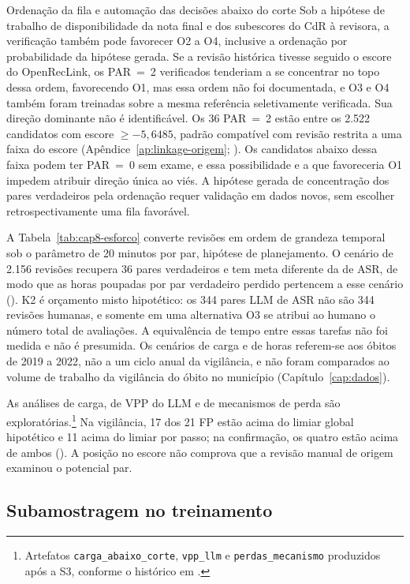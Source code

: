 \begin{chapter}{Ordenação da fila e automação das decisões abaixo do corte}
Sob a hipótese de trabalho de disponibilidade da nota final e dos subescores do CdR à revisora, a verificação também pode favorecer O2 a O4, inclusive a ordenação por probabilidade da hipótese gerada. Se a revisão histórica tivesse seguido o escore do OpenRecLink, os PAR~=~2 verificados tenderiam a se concentrar no topo dessa ordem, favorecendo O1, mas essa ordem não foi documentada, e O3 e O4 também foram treinadas sobre a mesma referência seletivamente verificada. Sua direção dominante não é identificável. Os 36 PAR~=~2 estão entre os 2.522 candidatos com escore $\geq-5{,}6485$, padrão compatível com revisão restrita a uma faixa do escore (Apêndice~\ref{ap:linkage-origem}; ). Os candidatos abaixo dessa faixa podem ter PAR~=~0 sem exame, e essa possibilidade e a que favoreceria O1 impedem atribuir direção única ao viés. A hipótese gerada de concentração dos pares verdadeiros pela ordenação requer validação em dados novos, sem escolher retrospectivamente uma fila favorável.



A Tabela~\ref{tab:cap8-esforco} converte revisões em ordem de grandeza temporal sob o parâmetro de 20 minutos por par, hipótese de planejamento. O cenário de 2.156 revisões recupera 36 pares verdadeiros e tem meta diferente da de ASR, de modo que as horas poupadas por par verdadeiro perdido pertencem a esse cenário (). K2 é orçamento misto hipotético: os 344 pares LLM de ASR não são 344 revisões humanas, e somente em uma alternativa O3 se atribui ao humano o número total de avaliações. A equivalência de tempo entre essas tarefas não foi medida e não é presumida. Os cenários de carga e de horas referem-se aos óbitos de 2019 a 2022, não a um ciclo anual da vigilância, e não foram comparados ao volume de trabalho da vigilância do óbito no município (Capítulo~\ref{cap:dados}).

As análises de carga, de VPP do LLM e de mecanismos de perda são exploratórias.\footnote{Artefatos \texttt{carga\_abaixo\_corte}, \texttt{vpp\_llm} e \texttt{perdas\_mecanismo} produzidos após a S3, conforme o histórico em .} Na vigilância, 17 dos 21 FP estão acima do limiar global hipotético e 11 acima do limiar por passo; na confirmação, os quatro estão acima de ambos (). A posição no escore não comprova que a revisão manual de origem examinou o potencial par.

\subsection{Subamostragem no treinamento}\label{sec:e4-subamostragem}


\end{chapter}
